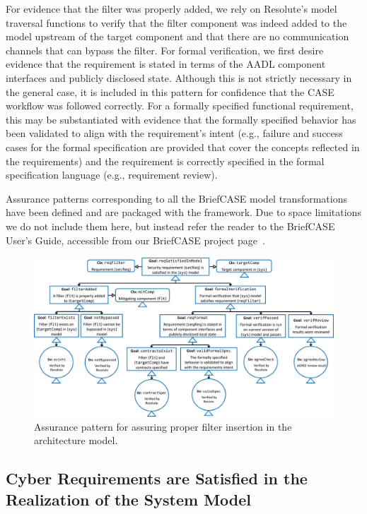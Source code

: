 For evidence that the filter was properly added, we rely on Resolute's model traversal functions to verify that the filter component was indeed added to the model upstream of the target component and that there are no communication channels that can bypass the filter.
%
For formal verification, we first desire evidence that the requirement is stated in terms of the AADL component interfaces and publicly disclosed state. Although this is not strictly necessary in the general case, it is included in this pattern for confidence that the CASE workflow was followed correctly.  For a formally specified functional requirement, this may be substantiated with evidence that the formally specified behavior has been validated to align with the requirement's intent (e.g., failure and success cases for the formal specification are provided that cover the concepts reflected in the requirements) and the requirement is correctly specified in the formal specification language (e.g., requirement review).

Assurance patterns corresponding to all the BriefCASE model transformations have been defined and are packaged with the framework.  Due to space limitations we do not include them here, but instead refer the reader to the BriefCASE User's Guide, accessible from our BriefCASE project page~\cite{BriefCASE-project}.


\begin{figure}[h] 
	\centering 
	\includegraphics[width=\textwidth]{figs/filter.png}
	\caption{Assurance pattern for assuring proper filter insertion in the architecture model.}
	\label{fig:filter} 
\end{figure}

\subsection{Cyber Requirements are Satisfied in the Realization of the System Model}

